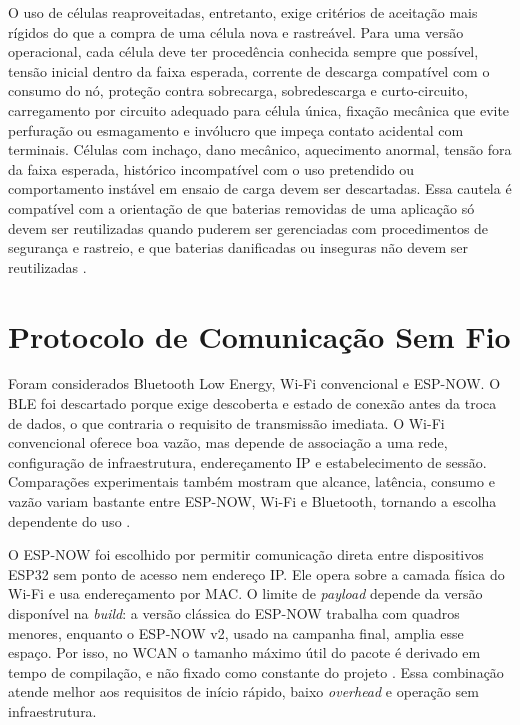 O uso de células reaproveitadas, entretanto, exige critérios de aceitação mais rígidos
do que a compra de uma célula nova e rastreável. Para uma versão operacional, cada
célula deve ter procedência conhecida sempre que possível, tensão inicial dentro da
faixa esperada, corrente de descarga compatível com o consumo do nó, proteção contra
sobrecarga, sobredescarga e curto-circuito, carregamento por circuito adequado para
célula única, fixação mecânica que evite perfuração ou esmagamento e invólucro que
impeça contato acidental com terminais. Células com inchaço, dano mecânico,
aquecimento anormal, tensão fora da faixa esperada, histórico incompatível com o uso
pretendido ou comportamento instável em ensaio de carga devem ser descartadas. Essa
cautela é compatível com a orientação de que baterias removidas de uma aplicação só
devem ser reutilizadas quando puderem ser gerenciadas com procedimentos de segurança
e rastreio, e que baterias danificadas ou inseguras não devem ser reutilizadas
\cite{epa_lithium_battery_recycling_faq}.

\section{Protocolo de Comunicação Sem Fio}

Foram considerados Bluetooth Low Energy, Wi-Fi convencional e ESP-NOW. O BLE foi
descartado porque exige descoberta e estado de conexão antes da troca de dados, o
que contraria o requisito de transmissão imediata. O Wi-Fi convencional oferece boa
vazão, mas depende de associação a uma rede, configuração de infraestrutura,
endereçamento IP e estabelecimento de sessão. Comparações experimentais também
mostram que alcance, latência, consumo e vazão variam bastante entre ESP-NOW,
Wi-Fi e Bluetooth, tornando a escolha dependente do uso \cite{eridani2021_espnow_wifi_bluetooth}.

O ESP-NOW foi escolhido por permitir comunicação direta entre dispositivos ESP32 sem
ponto de acesso nem endereço IP. Ele opera sobre a camada física do Wi-Fi e usa
endereçamento por MAC. O limite de \emph{payload} depende da versão disponível na
\emph{build}: a versão clássica do ESP-NOW trabalha com quadros menores, enquanto
o ESP-NOW v2, usado na campanha final, amplia esse espaço. Por isso, no WCAN o
tamanho máximo útil do pacote é derivado em tempo de compilação, e não fixado como
constante do projeto \cite{espressif_espnow_programming_guide,pasic2021_espnow_esp32}.
Essa combinação atende melhor aos requisitos de início rápido, baixo \emph{overhead} e
operação sem infraestrutura.

